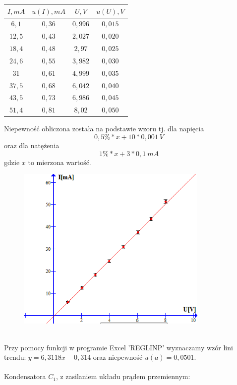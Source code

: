 \documentclass{article}
\begin{document}
\begin{center}
    \begin{tabular}{|c|c|c|c|}
    \hline
$I,mA$ & $u(I), mA$ & $U,V$ & $u(U), V$\\ \hline
$6,1$ & $0,36$ & $0,996$ & $0,015$\\ \hline
$12,5$ & $0,43$ & $2,027$ & $0,020$\\ \hline
$18,4$ & $0,48$ & $2,97$ & $0,025$\\ \hline
$24,6$ & $0,55$ & $3,982$ & $0,030$\\ \hline
$31$ & $0,61$ & $4,999$ & $0,035$\\ \hline
$37,5$ & $0,68$ & $6,042$ & $0,040$\\ \hline
$43,5$ & $0,73$ & $6,986$ & $0,045$\\ \hline
$51,4$ & $0,81$ & $8,02$ & $0,050$\\ \hline
    \end{tabular}
\end{center}
Niepewność obliczona została na podstawie wzoru tj. dla napięcia
$$0,5\% * x + 10 * 0,001\ V $$
oraz dla natężenia
$$1\% * x + 3 * 0,1\ mA$$
gdzie $x$ to mierzona wartość.
\begin{figure}[ht]
\centering
\includegraphics[height=8cm]{wykres_3.png}
\end{figure}\\
Przy pomocy funkcji w programie Excel 'REGLINP' wyznaczamy wzór lini trendu: $y = 6,3118x - 0,314$ oraz niepewność $u(a) = 0,0501$.\\\\
Kondensatora $C_1$, z zasilaniem układu prądem przemiennym:
\end{document}
